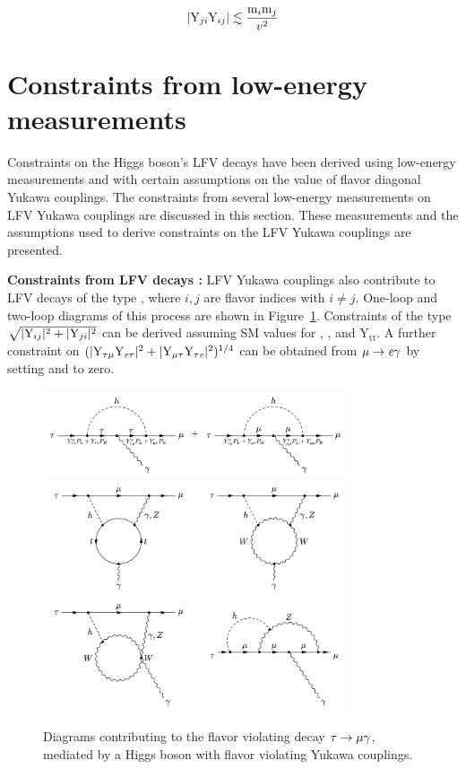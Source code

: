 \begin{equation}
  |\text{Y}_{ji} \text{Y}_{ij}| \lesssim \frac{\text{m}_{i} \text{m}_{j}}{v^2}
\end{equation}


\section{Constraints from low-energy measurements}

Constraints on the Higgs boson's LFV decays have been derived using low-energy measurements and with certain assumptions on the value of flavor diagonal Yukawa couplings. The constraints from several low-energy measurements on LFV Yukawa couplings are discussed in this section. These measurements and the assumptions used to derive constraints on the LFV Yukawa couplings are presented.

\textbf{Constraints from LFV decays \liljg:} LFV Yukawa couplings also contribute to LFV decays of the type \liljg, where $i, j$ are flavor indices with $i \neq j$. One-loop and two-loop diagrams of this process are shown in Figure~\ref{fig:tmg}. Constraints of the type $\sqrt{|\text{Y}_{ij}|^2+|\text{Y}_{ji}|^2}$ can be derived assuming SM values for \Ytt, \Ymm, and $\text{Y}_{\text{tt}}$. A further constraint on $(|\text{Y}_{\tau\mu} \text{Y}_{\textit{e}\tau}|^2 + |\text{Y}_{\mu\tau} \text{Y}_{\tau\textit{e}}|^2)^{1/4}$ can be obtained from $\mu \to \textit{e} \gamma$ by setting \Yme and \Yem to zero.

\begin{figure}[htbp]
  \centering
  \includegraphics[width=0.8\textwidth]{plots/chapter2/1loop.png} \\
  \includegraphics[width=0.8\textwidth]{plots/chapter2/2loop.png}
  \caption{Diagrams contributing to the flavor violating decay $\tau \to \mu \gamma$, mediated by a Higgs boson with flavor violating Yukawa couplings.}
  \label{fig:tmg}
\end{figure}


